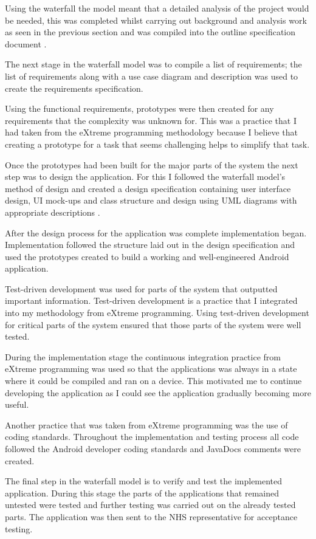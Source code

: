 Using the waterfall the model meant that a detailed analysis of the project would be needed, this was completed whilst carrying out background and analysis work as seen in the previous section and was compiled into the outline specification document \cite{waterfall}.

The next stage in the waterfall model was to compile a list of requirements; the list of requirements along with a use case diagram and description was used to create the requirements specification.

Using the functional requirements, prototypes were then created for any requirements that the complexity was unknown for. This was a practice that I had taken from the eXtreme programming methodology because I believe that creating a prototype for a task that seems challenging helps to simplify that task.

Once the prototypes had been built for the major parts of the system the next step was to design the application. For this I followed the waterfall model's method of design and created a design specification containing user interface design, UI mock-ups and class structure and design using UML diagrams with appropriate descriptions \cite{waterfall}. 

After the design process for the application was complete implementation began. Implementation followed the structure laid out in the design specification and used the prototypes created to build a working and well-engineered Android application.

Test-driven development was used for parts of the system that outputted important information. Test-driven development is a practice that I integrated into my methodology from eXtreme programming. Using test-driven development for critical parts of the system ensured that those parts of the system were well tested.

During the implementation stage the continuous integration practice from eXtreme programming was used so that the applications was always in a state where it could be compiled and ran on a device. This motivated me to continue developing the application as I could see the application gradually becoming more useful.

Another practice that was taken from eXtreme programming \cite{xp} was the use of coding standards. Throughout the implementation and testing process all code followed the Android developer coding standards and JavaDocs comments were created.

The final step in the waterfall model \cite{waterfall} is to verify and test the implemented application. During this stage the parts of the applications that remained untested were tested and further testing was carried out on the already tested parts. The application was then sent to the NHS representative for acceptance testing.

